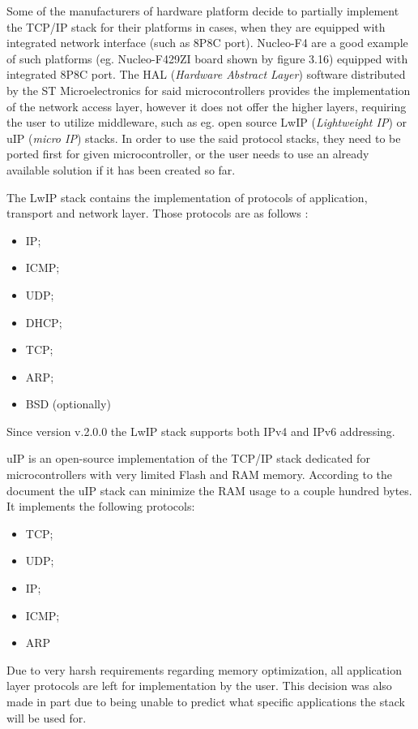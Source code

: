 Some of the manufacturers of hardware platform decide to partially implement the TCP/IP stack for their platforms in cases, when they are equipped with integrated network interface (such as 8P8C port). Nucleo-F4 are a good example of such platforms (eg. Nucleo-F429ZI board shown by figure 3.16) equipped with integrated 8P8C port. The HAL (\emph{Hardware Abstract Layer}) software distributed by the ST Microelectronics for said microcontrollers provides the implementation of the network access layer, however it does not offer the higher layers, requiring the user to utilize middleware, such as eg. open source LwIP (\emph{Lightweight IP}) or uIP (\emph{micro IP}) stacks. In order to use the said protocol stacks, they need to be ported first for given microcontroller, or the user needs to use an already available solution if it has been created so far.

The LwIP stack contains the implementation of protocols of application, transport and network layer. Those protocols are as follows \cite{lwip:protocols}:

\begin{itemize}
    \item [1)] IP;
    \item [2)] ICMP;
    \item [3)] UDP;
    \item [4)] DHCP;
    \item [5)] TCP;
    \item [6)] ARP;
    \item [7)] BSD (optionally)
\end{itemize}

Since version v.2.0.0 the LwIP stack supports both IPv4 and IPv6 addressing. 

uIP is an open-source implementation of the TCP/IP stack dedicated for microcontrollers with very limited Flash and RAM memory. According to the document \cite{ti:uip} the uIP stack can minimize the RAM usage to a couple hundred bytes. It implements the following protocols:

\begin{itemize}
    \item [1)] TCP;
    \item [2)] UDP;
    \item [3)] IP;
    \item [4)] ICMP;
    \item [5)] ARP
\end{itemize}

Due to very harsh requirements regarding memory optimization, all application layer protocols are left for implementation by the user. This decision was also made in part due to being unable to predict what specific applications the stack will be used for.
